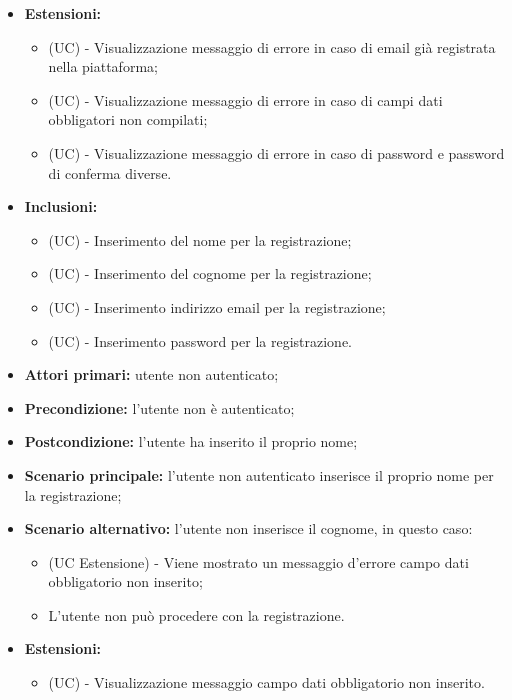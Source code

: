 \begin{itemize}
\begin{itemize}
	\end{itemize}
    \item \textbf{Estensioni:}
    \begin{itemize}
        \item (UC) - Visualizzazione messaggio di errore in caso di email già registrata nella piattaforma;
        \item (UC) - Visualizzazione messaggio di errore in caso di campi dati obbligatori non compilati;
        \item (UC) - Visualizzazione messaggio di errore in caso di password e password di conferma diverse.
    \end{itemize}
	\item \textbf{Inclusioni:}
	\begin{itemize}
		\item (UC) - Inserimento del nome per la registrazione;
		\item (UC) - Inserimento del cognome per la registrazione; 
		\item (UC) - Inserimento indirizzo email per la registrazione;
		\item (UC) - Inserimento password per la registrazione.
	\end{itemize}
\end{itemize}

\begin{itemize}
	\item \textbf{Attori primari:} utente non autenticato;
	\item \textbf{Precondizione:} l'utente non è autenticato;
	\item \textbf{Postcondizione:} l'utente ha inserito il proprio nome;
	\item \textbf{Scenario principale:} l'utente non autenticato inserisce il proprio nome per la registrazione;
	\item \textbf{Scenario alternativo:} l'utente non inserisce il cognome, in questo caso:
	\begin{itemize}
		\item (UC Estensione) - Viene mostrato un messaggio d'errore campo dati obbligatorio non inserito;
		\item L'utente non può procedere con la registrazione.
	\end{itemize}
	\item \textbf{Estensioni:}
	\begin{itemize}
		\item (UC) - Visualizzazione messaggio campo dati obbligatorio non inserito.
	\end{itemize}
\end{itemize}

